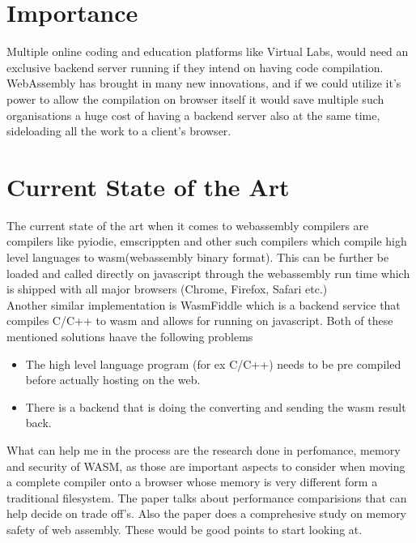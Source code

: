 \documentclass[11pt,letterpaper]{article}
\begin{document}
\section*{Importance}
Multiple online coding and education platforms like Virtual Labs, would need an exclusive backend server running if they intend on having code compilation. WebAssembly has brought in many new innovations, and if we could utilize it's power to allow the compilation on browser itself it would save multiple such organisations a huge cost of having a backend server also at the same time, sideloading all the work to a client's browser.

\section*{Current State of the Art} 
The current state of the art when it comes to webassembly compilers are compilers like pyiodie, emscrippten and other such compilers\cite{9678776} which compile high level languages to wasm(webassembly binary format). This can be further be loaded and called directly on javascript through the webassembly run time which is shipped with all major browsers (Chrome, Firefox, Safari etc.) \\
Another similar implementation is WasmFiddle\cite{WasmFiddleWasmFiddle} which is a backend service that compiles C/C++ to wasm and allows for running on javascript. 
Both of these mentioned solutions haave the following problems
\begin{itemize}
  \item The high level language program (for ex C/C++) needs to be pre compiled before actually hosting on the web.
  \item There is a backend that is doing the converting and sending the wasm result back.
\end{itemize}
What can help me in the process are the research done in perfomance, memory and security of WASM, as those are important aspects to consider when moving a complete compiler onto a browser whose memory is very different form a traditional filesystem.
The paper\cite{10.5555/3358807.3358817} talks about performance comparisions that can help decide on trade off's.
Also the paper\cite{10.1145/3337167.3337171} does a comprehesive study on memory safety of web assembly. These would be good points to start looking at.
\end{document}
